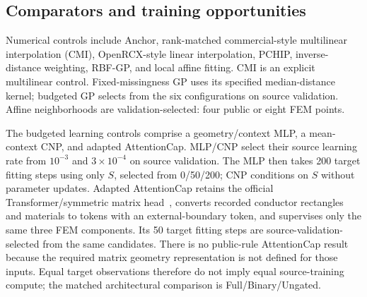 \documentclass[conference,10pt,letterpaper]{IEEEtran}
\begin{document}
\subsection{Comparators and training opportunities}
Numerical controls include Anchor, rank-matched commercial-style multilinear interpolation (CMI), OpenRCX-style linear interpolation, PCHIP, inverse-distance weighting, RBF-GP, and local affine fitting. CMI is an explicit multilinear control. Fixed-missingness GP uses its specified median-distance kernel; budgeted GP selects from the six configurations on source validation. Affine neighborhoods are validation-selected: four public or eight FEM points.

The budgeted learning controls comprise a geometry/context MLP, a mean-context CNP, and adapted AttentionCap. MLP/CNP select their source learning rate from $10^{-3}$ and $3\!\times\!10^{-4}$ on source validation. The MLP then takes 200 target fitting steps using only $S$, selected from 0/50/200; CNP conditions on $S$ without parameter updates. Adapted AttentionCap retains the official Transformer/symmetric matrix head~\cite{attentioncode}, converts recorded conductor rectangles and materials to tokens with an external-boundary token, and supervises only the same three FEM components. Its 50 target fitting steps are source-validation-selected from the same candidates. There is no public-rule AttentionCap result because the required matrix geometry representation is not defined for those inputs. Equal target observations therefore do not imply equal source-training compute; the matched architectural comparison is Full/Binary/Ungated.

\begin{table}[!t]
\centering\caption{Fixed-missingness completion at 30\%: mean-mask macro NRMSE (lower is better). In/Out denote geometric support; Boundary is the boundary-extrapolation mask. All 15 conditions are shown. Full, Binary, and Ungated average three matched members' predictions. Bold is best among displayed methods. The fixed-missingness GP uses its specified kernel; the budget-selected GP in Fig.~\ref{fig:budget} is a separate comparison.}
\label{tab:missing}
\small\setlength{\tabcolsep}{6pt}
\end{table}
\end{document}
